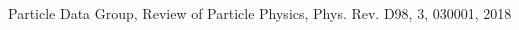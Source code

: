 \begin{thebibliography}{99.}%

 Particle Data Group, Review of Particle Physics, Phys. Rev. D98, 3, 030001, 2018

\end{thebibliography}
